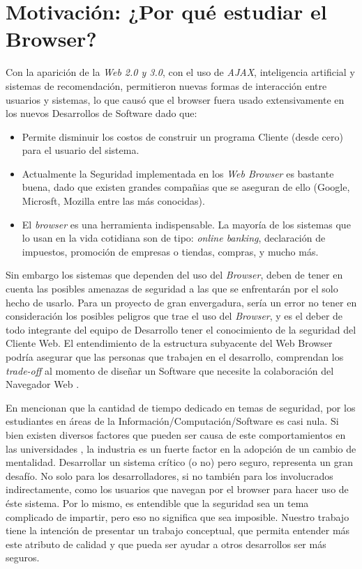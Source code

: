 \section{Motivación: ¿Por qué estudiar el Browser?}
\label{chap1:motiv}

Con la aparición de la \textit{Web 2.0 y 3.0}, con el uso de \textit{AJAX}, inteligencia artificial y sistemas de recomendación, permitieron nuevas formas de interacción entre usuarios y sistemas, lo que causó que el browser fuera usado extensivamente en los nuevos Desarrollos de Software dado que:
\begin{itemize}
	\item Permite disminuir los costos de construir un programa Cliente (desde cero) para el usuario del sistema.
	\item Actualmente la Seguridad implementada en los \textit{Web Browser} es bastante buena, dado que existen grandes compañias que se aseguran de ello (Google, Microsft, Mozilla entre las más conocidas). 
	\item El \textit{browser} es una herramienta indispensable. La mayoría de los sistemas que lo usan en la vida cotidiana son de tipo: \textit{online banking}, declaración de impuestos, promoción de empresas o tiendas, compras, y mucho más.
\end{itemize}

Sin embargo los sistemas que dependen del uso del \textit{Browser}, deben de tener en cuenta las posibles amenazas de seguridad a las que se enfrentarán por el solo hecho de usarlo. Para un proyecto de gran envergadura, sería un error no tener en consideración los posibles peligros que trae el uso del \textit{Browser}, y es el deber de todo integrante del equipo de Desarrollo tener el conocimiento de la seguridad del Cliente Web. El entendimiento de la estructura subyacente del Web Browser podría asegurar que las personas que trabajen en el desarrollo, comprendan los \textit{trade-off} al momento de diseñar un Software que necesite la colaboración del Navegador Web \cite{535061, 2005-grosskurth-browser-refarch,preprint-grosskurth-browser-archevol}.

En \cite{goertzel2007software, WhyteHarrison} mencionan que la cantidad de tiempo dedicado en temas de seguridad, por los estudiantes en áreas de la Información/Computación/Software es casi nula. Si bien existen diversos factores que pueden ser causa de este comportamientos en las universidades \cite{WhyteHarrison}, la industria es un fuerte factor en la adopción de un cambio de mentalidad. Desarrollar un sistema crítico (o no) pero seguro, representa un gran desafío. No solo para los desarrolladores, si no también para los involucrados indirectamente, como los usuarios que navegan por el browser para hacer uso de éste sistema. Por lo mismo, es entendible que la seguridad sea un tema complicado de impartir, pero eso no significa que sea imposible. Nuestro trabajo tiene la intención de presentar un trabajo conceptual, que permita entender más este atributo de calidad y que pueda ser ayudar a otros desarrollos ser más seguros.

